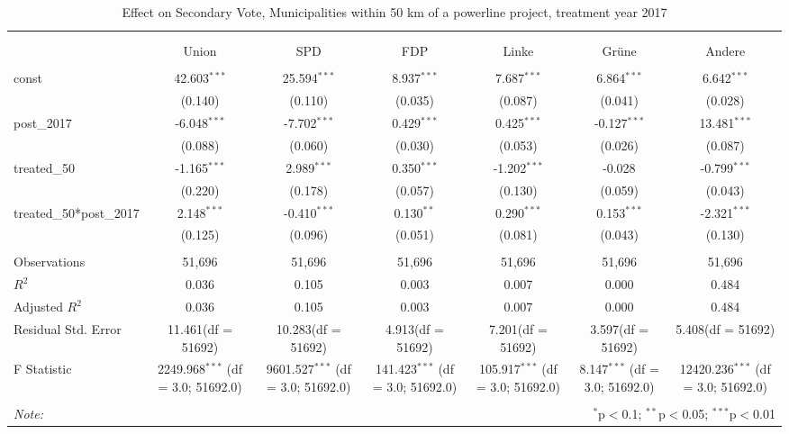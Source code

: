 \documentclass[12pt]{article}
\begin{document}
\begin{table}[!htbp] \centering
  \caption{Effect on Secondary Vote, Municipalities within 50 km of a powerline project, treatment year 2017}
\begin{tabular}{@{\extracolsep{5pt}}lcccccc}
\\[-1.8ex]\hline
\hline \\[-1.8ex]
\\[-1.8ex] & \multicolumn{1}{c}{Union} & \multicolumn{1}{c}{SPD} & \multicolumn{1}{c}{FDP} & \multicolumn{1}{c}{Linke} & \multicolumn{1}{c}{Grüne} & \multicolumn{1}{c}{Andere}  \\
\hline \\[-1.8ex]
 const & 42.603$^{***}$ & 25.594$^{***}$ & 8.937$^{***}$ & 7.687$^{***}$ & 6.864$^{***}$ & 6.642$^{***}$ \\
  & (0.140) & (0.110) & (0.035) & (0.087) & (0.041) & (0.028) \\
 post_2017 & -6.048$^{***}$ & -7.702$^{***}$ & 0.429$^{***}$ & 0.425$^{***}$ & -0.127$^{***}$ & 13.481$^{***}$ \\
  & (0.088) & (0.060) & (0.030) & (0.053) & (0.026) & (0.087) \\
 treated_50 & -1.165$^{***}$ & 2.989$^{***}$ & 0.350$^{***}$ & -1.202$^{***}$ & -0.028$^{}$ & -0.799$^{***}$ \\
  & (0.220) & (0.178) & (0.057) & (0.130) & (0.059) & (0.043) \\
 treated_50*post_2017 & 2.148$^{***}$ & -0.410$^{***}$ & 0.130$^{**}$ & 0.290$^{***}$ & 0.153$^{***}$ & -2.321$^{***}$ \\
  & (0.125) & (0.096) & (0.051) & (0.081) & (0.043) & (0.130) \\
\hline \\[-1.8ex]
 Observations & 51,696 & 51,696 & 51,696 & 51,696 & 51,696 & 51,696 \\
 $R^2$ & 0.036 & 0.105 & 0.003 & 0.007 & 0.000 & 0.484 \\
 Adjusted $R^2$ & 0.036 & 0.105 & 0.003 & 0.007 & 0.000 & 0.484 \\
 Residual Std. Error & 11.461(df = 51692) & 10.283(df = 51692) & 4.913(df = 51692) & 7.201(df = 51692) & 3.597(df = 51692) & 5.408(df = 51692)  \\
 F Statistic & 2249.968$^{***}$ (df = 3.0; 51692.0) & 9601.527$^{***}$ (df = 3.0; 51692.0) & 141.423$^{***}$ (df = 3.0; 51692.0) & 105.917$^{***}$ (df = 3.0; 51692.0) & 8.147$^{***}$ (df = 3.0; 51692.0) & 12420.236$^{***}$ (df = 3.0; 51692.0) \\
\hline
\hline \\[-1.8ex]
\textit{Note:} & \multicolumn{6}{r}{$^{*}$p$<$0.1; $^{**}$p$<$0.05; $^{***}$p$<$0.01} \\
\end{tabular}
\end{table}
\end{document}
